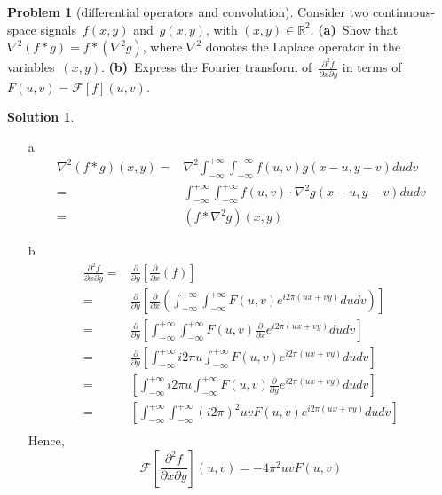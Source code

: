 \documentclass[11pt]{article}
\theoremstyle{plain}
\theoremstyle{definition}
\newtheorem{problem}{Problem}
\newtheorem{solution}{Solution}
\theoremstyle{remark}
\begin{document}
\begin{problem}[differential operators and convolution]
Consider two continuous-space signals~$f(x,y)$ and~$g(x,y)$,
with $(x,y)\in\mathbb{R}^2$. {\bf(a)}~Show that
$\nabla^2(f\ast g)=f\ast(\nabla^2g)$, where $\nabla^2$
donotes the Laplace operator in the variables~$(x,y)$.
{\bf(b)}~Express the Fourier transform 
of~$\frac{\partial^2 f}{\partial x\partial y}$
in terms of~$F(u,v)=\mathcal{F}[f](u,v)$.
\end{problem}
\begin{solution}
	\begin{enumerate}
	\item[a]
	\begin{eqnarray*}
		\nabla^2 (f*g) (x,y) =& \nabla^2 \int_{-\infty}^{+\infty} \int_{-\infty}^{+\infty} f(u,v) g(x-u, y-v) dudv\\
		=& \int_{-\infty}^{+\infty}\int_{-\infty}^{+\infty} f(u,v) \cdot \nabla^2g(x-u,y-v)dudv\\
		=& (f*\nabla^2g)(x,y)
	\end{eqnarray*}
	
	\item[b]
	\begin{eqnarray*}
		\frac{\partial ^2 f}{\partial x\partial y} =& \frac{\partial}{\partial y}[\frac{\partial}{\partial x}(f)]\\
		=& \frac{\partial}{\partial y}[\frac{\partial}{\partial x}(\int_{-\infty}^{+\infty}\int_{-\infty}^{+\infty} F(u,v) e^{i2\pi (ux+vy)} dudv)]\\
		=&  \frac{\partial}{\partial y}[\int_{-\infty}^{+\infty}\int_{-\infty}^{+\infty} F(u,v) \frac{\partial}{\partial x} e^{i2\pi (ux+vy)} dudv]\\
		=& \frac{\partial}{\partial y}[\int_{-\infty}^{+\infty} i2\pi u \int_{-\infty}^{+\infty} F(u,v) e^{i2\pi (ux+vy)} dudv]\\
		=& [\int_{-\infty}^{+\infty} i2\pi u \int_{-\infty}^{+\infty} F(u,v) \frac{\partial}{\partial y} e^{i2\pi (ux+vy)} dudv]\\
		=& [\int_{-\infty}^{+\infty}  \int_{-\infty}^{+\infty} (i2\pi)^2 uvF(u,v) e^{i2\pi (ux+vy)} dudv]\\
	\end{eqnarray*}
	Hence,
	\begin{equation*}
	\mathcal{F}[\frac{\partial ^2 f}{\partial x\partial y}](u,v) = -4\pi^2 uv F(u,v)
	\end{equation*}
	\end{enumerate}
\end{solution}
\end{document}
